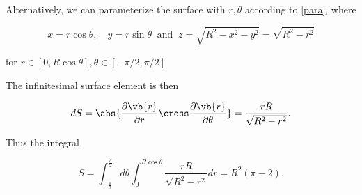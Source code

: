 \documentclass[english,a4paper,12pt]{report}
\begin{document}
{Alternatively, we can parameterize the surface with \(r, \theta \) according to \cref{para}, where 

\begin{equation}
	x = r\cos \theta , \quad y = r\sin \theta ~\text { and }~ z = \sqrt{R^2 - x^2 - y^2} = \sqrt{R^2 - r^2}
\end{equation}

for \( r \in [0,R\cos \theta ], \theta \in \left[-\pi /2, \pi /2  \right]\) 

The infinitesimal surface element is then 

\begin{equation}
	dS = \abs{\frac{\partial \vb{r} }{\partial r} \cross \frac{\partial \vb{r} }{\partial \theta }  } = \frac{rR}{\sqrt{R^2-r^2} }. 
\end{equation}

Thus the integral

\begin{equation}
	S = \int_{-\frac{\pi }{2} }^{\frac{\pi }{2} }d \theta \int_{0}^{R\cos \theta }\frac{rR}{\sqrt{R^2 - r^2} }dr = R^2(\pi -2).     
\end{equation}



} 

\end{document}
